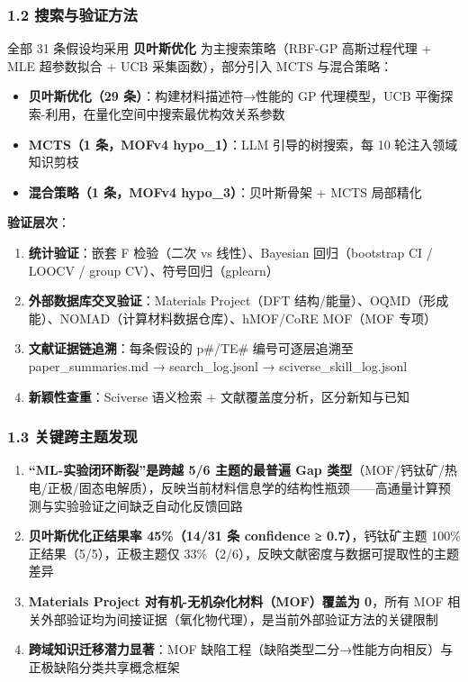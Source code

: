 \documentclass[12pt,a4paper]{ctexart}
\providecommand{\tightlist}{%
  \setlength{\itemsep}{0pt}\setlength{\parskip}{0pt}}
\begin{document}
\subsubsection{1.2 搜索与验证方法}\label{ux641cux7d22ux4e0eux9a8cux8bc1ux65b9ux6cd5}

全部 31 条假设均采用 \textbf{贝叶斯优化} 为主搜索策略（RBF-GP 高斯过程代理 + MLE 超参数拟合 + UCB 采集函数），部分引入 MCTS 与混合策略：

\begin{itemize}
\tightlist
\item
  \textbf{贝叶斯优化（29 条）}：构建材料描述符→性能的 GP 代理模型，UCB 平衡探索-利用，在量化空间中搜索最优构效关系参数
\item
  \textbf{MCTS（1 条，MOFv4 hypo\_1）}：LLM 引导的树搜索，每 10 轮注入领域知识剪枝
\item
  \textbf{混合策略（1 条，MOFv4 hypo\_3）}：贝叶斯骨架 + MCTS 局部精化
\end{itemize}

\textbf{验证层次}：

\begin{enumerate}
\def\labelenumi{\arabic{enumi}.}
\tightlist
\item
  \textbf{统计验证}：嵌套 F 检验（二次 vs 线性）、Bayesian 回归（bootstrap CI / LOOCV / group CV）、符号回归（gplearn）
\item
  \textbf{外部数据库交叉验证}：Materials Project（DFT 结构/能量）、OQMD（形成能）、NOMAD（计算材料数据仓库）、hMOF/CoRE MOF（MOF 专项）
\item
  \textbf{文献证据链追溯}：每条假设的 p\#/TE\# 编号可逐层追溯至 paper\_summaries.md → search\_log.jsonl → sciverse\_skill\_log.jsonl
\item
  \textbf{新颖性查重}：Sciverse 语义检索 + 文献覆盖度分析，区分新知与已知
\end{enumerate}

\subsubsection{1.3 关键跨主题发现}\label{ux5173ux952eux8de8ux4e3bux9898ux53d1ux73b0}

\begin{enumerate}
\def\labelenumi{\arabic{enumi}.}
\tightlist
\item
  \textbf{``ML-实验闭环断裂''是跨越 5/6 主题的最普遍 Gap 类型}（MOF/钙钛矿/热电/正极/固态电解质），反映当前材料信息学的结构性瓶颈------高通量计算预测与实验验证之间缺乏自动化反馈回路
\item
  \textbf{贝叶斯优化正结果率 45\%（14/31 条 confidence ≥ 0.7）}，钙钛矿主题 100\% 正结果（5/5），正极主题仅 33\%（2/6），反映文献密度与数据可提取性的主题差异
\item
  \textbf{Materials Project 对有机-无机杂化材料（MOF）覆盖为 0}，所有 MOF 相关外部验证均为间接证据（氧化物代理），是当前外部验证方法的关键限制
\item
  \textbf{跨域知识迁移潜力显著}：MOF 缺陷工程（缺陷类型二分→性能方向相反）与正极缺陷分类共享概念框架
\end{enumerate}
\end{document}
